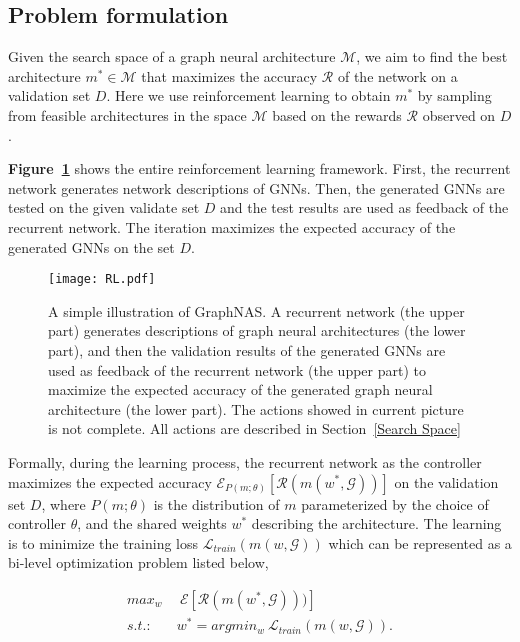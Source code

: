 \documentclass{article}
\begin{document}
\subsection{Problem formulation}
Given the search space of a graph neural architecture $\mathcal{M}$, we aim to find the best architecture $m^{*} \in \mathcal{M}$ that maximizes the accuracy $\mathcal{R}$ of the network on a validation set $D$. Here we use reinforcement learning to obtain $m^{*}$ by sampling from feasible architectures in the space $\mathcal{M}$ based on the rewards  $\mathcal{R}$ observed on $D$. 

\textbf{Figure~\ref{fig:GraphNAS-RL}} shows the entire reinforcement learning framework. First, the recurrent network generates network descriptions of GNNs. Then, the generated GNNs are tested on the given validate set $D$ and the test results are used as feedback of the recurrent network. The iteration maximizes the expected accuracy of the generated GNNs on the set $D$. 

\label{formulation}
\begin{figure}
	\texttt{[image: RL.pdf]}
	\caption{A simple illustration of GraphNAS. A recurrent network (the upper part) generates descriptions of graph neural architectures (the lower part), and then the validation results of the generated GNNs are used as feedback of the recurrent network (the upper part) to maximize the expected accuracy of the generated graph neural architecture (the lower part). The actions showed in current picture is not complete. All actions are described in Section~\ref{Search Space} }
	\label{fig:GraphNAS-RL}
\end{figure}

Formally, during the learning process, the recurrent network as the controller maximizes the expected accuracy $\mathcal{E}_{P(m;\theta)}[\mathcal{R}(m(w^{*},\mathcal{G}))]$ on the validation set $D$, where $P(m;\theta)$ is the distribution of $m$ parameterized by the choice of controller $\theta$, and the shared weights $w^{*}$ describing the architecture. The learning is to minimize the training loss $\mathcal{L}_{train}(m(w,\mathcal{G}))$ which can be represented as a bi-level optimization problem listed below, 

\begin{small}
	\begin{align}
max_{w} &  ~~ \mathcal{E}[\mathcal{R}(m(w^{*},\mathcal{G})))] \nonumber \\
	s.t.: & \ w^{*}=argmin_{w} ~ \mathcal{L}_{train}(m(w,\mathcal{G})) . 
	\end{align}
\end{small}
\end{document}
